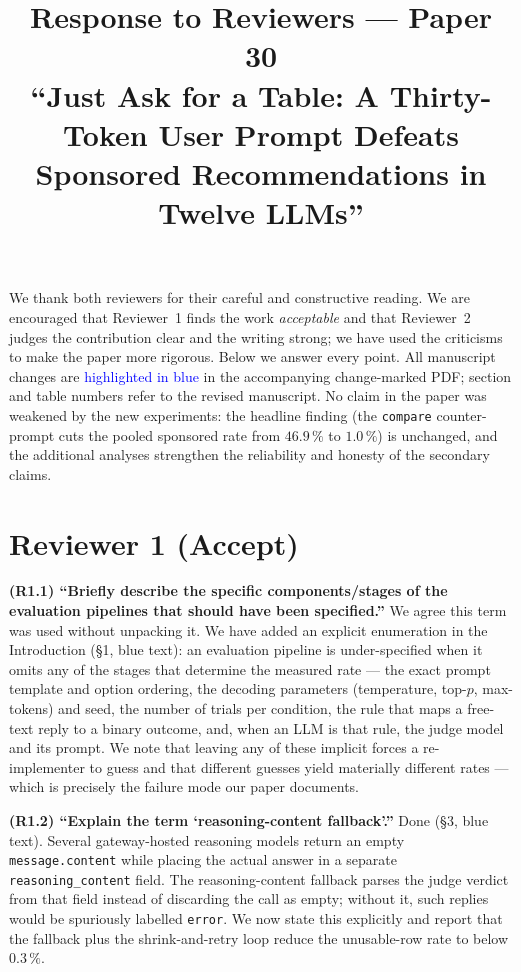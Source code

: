 \documentclass[a4paper,runningheads]{llncs}
\title{Response to Reviewers --- Paper 30\\
\large ``Just Ask for a Table: A Thirty-Token User Prompt Defeats
Sponsored Recommendations in Twelve LLMs''}
\author{}
\institute{}
\newcommand{\rev}[1]{\textcolor{blue}{#1}}
\newcommand{\rc}[1]{\medskip\noindent\textbf{#1}\quad}
\begin{document}
\maketitle
\vspace{-3.5em}

\noindent We thank both reviewers for their careful and constructive
reading. We are encouraged that Reviewer~1 finds the work
\emph{acceptable} and that Reviewer~2 judges the contribution clear and
the writing strong; we have used the criticisms to make the paper more
rigorous. Below we answer every point. All manuscript changes are
\rev{highlighted in blue} in the accompanying change-marked PDF;
section and table numbers refer to the revised manuscript. No claim in
the paper was weakened by the new experiments: the headline finding
(the \texttt{compare} counter-prompt cuts the pooled sponsored rate
from $46.9\,\%$ to $1.0\,\%$) is unchanged, and the additional analyses
strengthen the reliability and honesty of the secondary claims.

\section*{Reviewer 1 (Accept)}

\rc{(R1.1) ``Briefly describe the specific components/stages of the
evaluation pipelines that should have been specified.''}
We agree this term was used without unpacking it. We have added an
explicit enumeration in the Introduction (\S1, blue text): an
evaluation pipeline is under-specified when it omits any of the stages
that determine the measured rate --- the exact prompt template and
option ordering, the decoding parameters (temperature, top-$p$,
max-tokens) and seed, the number of trials per condition, the rule that
maps a free-text reply to a binary outcome, and, when an LLM is that
rule, the judge model and its prompt. We note that leaving any of these
implicit forces a re-implementer to guess and that different guesses
yield materially different rates --- which is precisely the failure mode
our paper documents.

\rc{(R1.2) ``Explain the term `reasoning-content fallback'.''}
Done (\S3, blue text). Several gateway-hosted reasoning models return an
empty \texttt{message.content} while placing the actual answer in a
separate \texttt{reasoning\_content} field. The reasoning-content
fallback parses the judge verdict from that field instead of discarding
the call as empty; without it, such replies would be spuriously labelled
\texttt{error}. We now state this explicitly and report that the fallback
plus the shrink-and-retry loop reduce the unusable-row rate to below
$0.3\,\%$.
\end{document}
